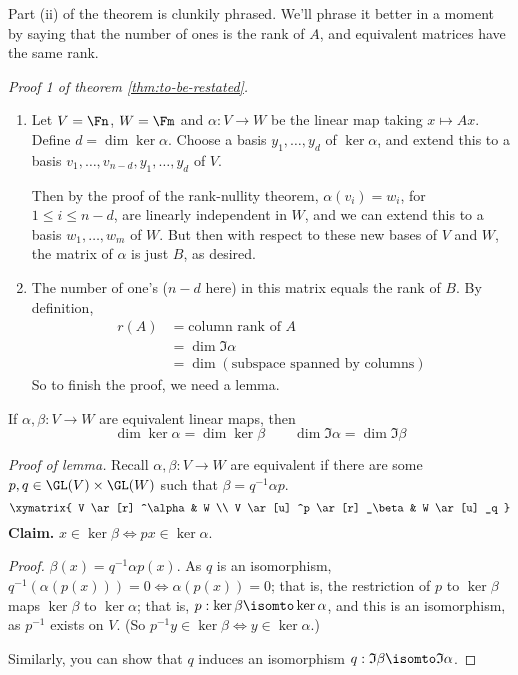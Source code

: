Part (ii) of the theorem is clunkily phrased. We'll phrase it better in a moment by saying that the number of ones is the rank of $A$, and equivalent matrices have the same rank.


\emph{Proof 1 of theorem \ref{thm:to-be-restated}.}
	\begin{enumerate}
		\item Let $V=\Fn$, $W=\Fm$ and $\alpha:V\to W$ be the linear map taking $x\mapsto Ax$. Define $d=\dim\ker\alpha$. Choose a basis $y_1,\ldots,y_d$ of $\ker\alpha$, and extend this to a basis $v_1,\ldots,v_{n-d}, y_1,\ldots,y_d$ of $V$. %
		
		Then by the proof of the rank-nullity theorem, $\alpha(v_i)=w_i$, for $1\leq i\leq n-d$, are linearly independent in $W$, and we can extend this to a basis $w_1,\ldots,w_m$ of $W$. But then with respect to these new bases of $V$ and $W$, the matrix of $\alpha$ is just $B$, as desired. %
		\item The number of one's ($n-d$ here) in this matrix equals the rank of $B$. By definition, %
		\begin{align*}
			r(A)
			&= \text{column rank of } A \\
			&= \dim \Im \alpha \\
			&= \dim(\text{subspace spanned by columns})
		\end{align*}
		So to finish the proof, we need a lemma.
	\end{enumerate}

\begin{lemma}
	If $\alpha,\beta:V\to W$ are equivalent linear maps, then %
	\begin{equation*}
		\dim\ker\alpha = \dim\ker\beta
		\qquad
		\dim\Im\alpha = \dim\Im\beta
	\end{equation*}
\end{lemma}

\begin{proof}
	[Proof of lemma] Recall $\alpha,\beta:V\to W$ are equivalent if there are some $p,q\in\GL(V)\times \GL(W)$ such that $\beta=q^{-1}\alpha p$. %
	\begin{equation*}
		\xymatrix{
			V
				\ar [r] ^\alpha
			&
			W \\
			V
				\ar [u] ^p
				\ar [r] _\beta
			&
			W
				\ar [u] _q
		}
	\end{equation*}
	\textbf{Claim.} $x\in\ker\beta \iff px\in\ker\alpha$.
	
	\emph{Proof.} $\beta(x)=q^{-1}\alpha p(x)$. As $q$ is an isomorphism, $q^{-1}(\alpha(p(x))) = 0 \iff \alpha(p(x)) = 0$; that is, the restriction of $p$ to $\ker\beta$ maps $\ker\beta$ to $\ker\alpha$; that is, $p:\ker\beta\isomto\ker\alpha$, and this is an isomorphism, as $p^{-1}$ exists on $V$. (So $p^{-1} y \in \ker\beta \iff y\in\ker\alpha$.) %
	
	Similarly, you can show that $q$ induces an isomorphism $q:\Im\beta \isomto \Im\alpha$. %
\end{proof}

